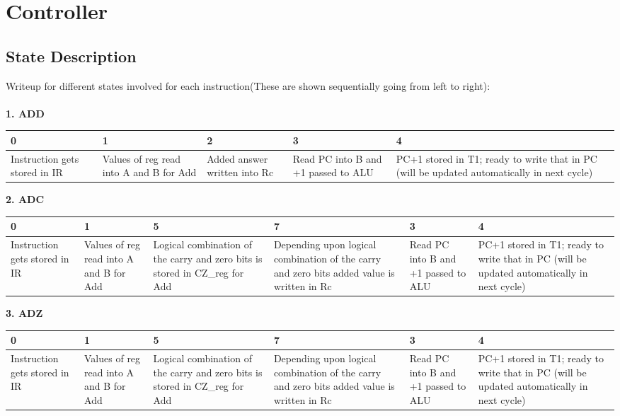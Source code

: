 \documentclass[11pt,fleqn,oneside]{book} %
\begin{document}

\chapter{Controller}


\section{State Description}
Writeup for different states involved for each instruction(These are shown sequentially going from left to right):\\ \\

\textbf{1. ADD }
\begin{center}
 \begin{tabular}{ | m{5em} | m{5em} | m{5em} | m{5em} | m{7em} | } 
 \hline
 0 & 1 & 2 & 3 & 4 \\ [0.5ex] 
 \hline
 Instruction gets stored in IR & Values of reg read into A and B for Add & Added answer written into Rc & Read PC into B and +1 passed to ALU & PC+1 stored in T1; ready to write that in PC (will be updated automatically in next cycle) \\ [1ex]
 \hline
\end{tabular}
\end{center}

\vspace{0.5cm}

\textbf{2. ADC }
\begin{center}
 \begin{tabular}{ | m{5em} | m{5em} | m{5em} | m{7em} | m{7em} | m{7em} | } 
 \hline
 0 & 1 & 5 & 7 & 3 & 4 \\ [0.5ex]
 \hline
 Instruction gets stored in IR & Values of reg read into A and B for Add & Logical combination of the carry and zero bits is stored in CZ\_reg for Add & Depending upon logical combination of the carry and zero bits added value is written in Rc & Read PC into B and +1 passed to ALU & PC+1 stored in T1; ready to write that in PC (will be updated automatically in next cycle)  \\ [1ex]
 \hline
\end{tabular}
\end{center}

\newpage 

\textbf{3. ADZ }
\begin{center}
 \begin{tabular}{ | m{5em} | m{5em} | m{5em} | m{5em} | m{7em} | m{7em} | } 
 \hline
 0 & 1 & 5 & 7 & 3 & 4 \\ [0.5ex]
 \hline
 Instruction gets stored in IR & Values of reg read into A and B for Add & Logical combination of the carry and zero bits is stored in CZ\_reg for Add & Depending upon logical combination of the carry and zero bits added value is written in Rc & Read PC into B and +1 passed to ALU & PC+1 stored in T1; ready to write that in PC (will be updated automatically in next cycle)  \\ [1ex]
 \hline
\end{tabular}
\end{center}
\end{document}
